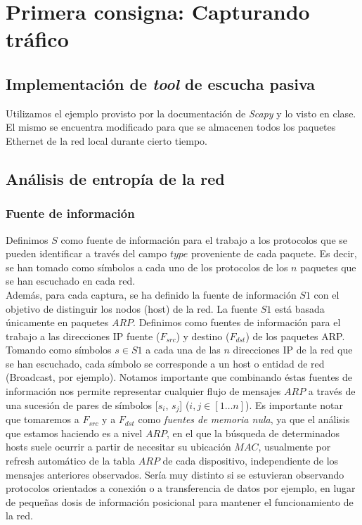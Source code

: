 \section{Primera consigna: Capturando tráfico}

\subsection{Implementación de \emph{tool} de escucha pasiva}
Utilizamos el ejemplo provisto por la documentación de \emph{Scapy} y lo visto en clase. 
El mismo se encuentra modificado para que se almacenen todos los paquetes Ethernet de la red local durante cierto tiempo.

\subsection{Análisis de entropía de la red}

\subsubsection{Fuente de información}
Definimos $S$ como fuente de información para el trabajo a los protocolos que se pueden identificar a través del campo $type$ 
proveniente de cada paquete. Es decir, se han tomado como símbolos a cada uno de los protocolos de los $n$ paquetes que se han escuchado en cada red.\\

Además, para cada captura, se ha definido la fuente de información $S1$ con el objetivo de distinguir los nodos (host) de la red. La fuente $S1$
está basada únicamente en paquetes $ARP$. Definimos como fuentes de información para el trabajo a las direcciones IP fuente ($F_{src}$) y destino ($F_{dst}$) de los paquetes ARP. 
Tomando como símbolos $s \in S1$ a cada una de las $n$ direcciones IP de la red que se han escuchado, cada símbolo se corresponde a un host o 
entidad de red (Broadcast, por ejemplo).
Notamos importante que combinando éstas fuentes de información nos permite representar cualquier flujo de mensajes $ARP$ a través de una sucesión
de pares de símbolos [$s_i$, $s_j$] ($i,j \in [1\ldots n]$).
Es importante notar que tomaremos a $F_{src}$ y a $F_{dst}$ como \emph{fuentes de memoria nula}, ya que el análisis que estamos haciendo es a 
nivel $ARP$, en el que la búsqueda de determinados hosts suele ocurrir a partir de necesitar su ubicación $MAC$, usualmente por refresh automático
de la tabla $ARP$ de cada dispositivo, independiente de los mensajes anteriores observados.
Sería muy distinto si se estuvieran observando protocolos orientados a conexión o a transferencia de datos por ejemplo, en lugar
de pequeñas dosis de información posicional para mantener el funcionamiento de la red.\\

